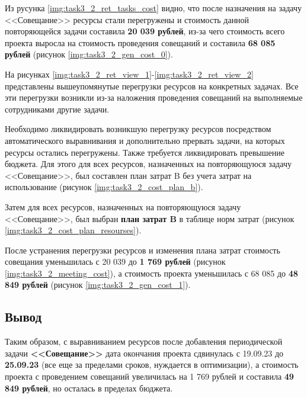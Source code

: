 Из русунка \ref{img:task3_2_ret_tasks_cost} видно, что после назначения на задачу <<Совещание>> ресурсы стали перегружены и стоимость данной повторяющейся задачи составила \textbf{20 039 рублей}, из-за чего стоимость всего проекта выросла на стоимость проведения совещаний и составила \textbf{68 085 рублей} (рисунок \ref{img:task3_2_gen_cost_0}).

На рисунках \ref{img:task3_2_ret_view_1}-\ref{img:task3_2_ret_view_2} представлены вышеупомянутые перегрузки ресурсов на конкретных задачах. Все эти перегрузки возникли из-за наложения проведения совещаний на выполняемые сотрудниками другие задачи.

Необходимо ликвидировать возникшую перегрузку ресурсов посредством автоматического выравнивания и дополнительно прервать задачи, на которых ресурсы остались перегружены. Также требуется ликвидировать превышение бюджета. Для этого для всех ресурсов, назначенных на повторяющуюся задачу <<Совещание>>, был составлен план затрат B без учета затрат на использование (рисунок \ref{img:task3_2_cost_plan_b}).

Затем для всех ресурсов, назначенных на повторяющуюся задачу <<Совещание>>, был выбран \textbf{план затрат B} в таблице норм затрат (рисунок \ref{img:task3_2_cost_plan_resourses}).

После устранения перегрузки ресурсов и изменения плана затрат стоимость совещания уменьшилась с 20 039 до \textbf{1 769 рублей} (рисунок \ref{img:task3_2_meeting_cost}), а стоимость проекта уменьшилась с 68 085 до \textbf{48 849 рублей} (рисунок \ref{img:task3_2_gen_cost_1}).

\subsection*{Вывод}
Таким образом, с выравниванием ресурсов после добавления периодической задачи \textbf{<<Совещание>>} дата окончания проекта сдвинулась с 19.09.23 до \textbf{25.09.23} (все еще за пределами сроков, нуждается в оптимизации), а стоимость проекта с проведением совещаний увеличилась на 1 769 рублей и составила \textbf{49 849 рублей}, но осталась в пределах бюджета.

